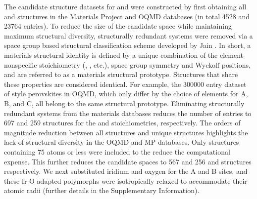 %
%
%
The candidate structure datasets for \IrOtwo and \IrOthree were constructed by first obtaining all \ABtwo and \ABthree structures in the Materials Project\cite{Jain2013} and OQMD\cite{Kirklin2015} databases
(in total \num{4528} \ABtwo and \num{23764} \ABthree entries).
%
To reduce the size of the candidate space while maintaining maximum structural diversity, structurally redundant systems were removed via a space group based structural classification scheme developed by Jain  \cite{Jain2018}.
%
In short, a materials structural identity is defined by a unique combination of the element-nonspecific stoichiometry (\ABtwo, \ABthree, etc.), space group symmetry and Wyckoff positions, and are referred to as a materials structural prototype.
%
Structures that share these properties are considered identical.
%
For example, the \num{300000} entry dataset of \ABOthree style perovskites in OQMD, which only differ by the choice of elements for A, B, and C, all belong to the same structural prototype.
%
Eliminating structurally redundant systems from the materials databases reduces the number of entries to \num{697} and \num{259} structures for the \ABtwo and \ABthree stoichiometries, respectively.
%
The orders of magnitude reduction between all structures and unique structures highlights the lack of structural diversity in the OQMD and MP databases.
%
Only structures containing 75 atoms or less were included to the reduce the computational expense.
%
This further reduces the candidate spaces to \num{567} and \num{256} \ABtwo and \ABthree structures respectively.
%
We next substituted iridium and oxygen for the A and B sites, and these Ir-O adapted polymorphs were isotropically relaxed to accommodate their atomic radii
(further details in the Supplementary Information).
